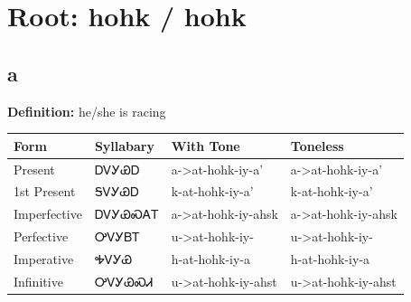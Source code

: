 \documentclass{article}%
\begin{document}
%
\normalsize%
\section*{Root: hohk / hohk}%
\subsection*{a}%
\textbf{Definition: }%
he/she is racing%
\\[0.5em]%
\begin{tabular}{|l|l|l|l|}%
\hline%
\textbf{Form}&\textbf{Syllabary}&\textbf{With Tone}&\textbf{Toneless}\\%
\hline%
Present&ᎠᏙᎩᏯᎠ&a{-}>at{-}hohk{-}iy{-}a'&a{-}>at{-}hohk{-}iy{-}a'\\%
1st Present&ᎦᏙᎩᏯᎠ&k{-}at{-}hohk{-}iy{-}a'&k{-}at{-}hohk{-}iy{-}a'\\%
Imperfective&ᎠᏙᎩᏯᏍᎪᎢ&a{-}>at{-}hohk{-}iy{-}ahsk&a{-}>at{-}hohk{-}iy{-}ahsk\\%
Perfective&ᎤᏙᎩᏴᎢ&u{-}>at{-}hohk{-}iy{-}&u{-}>at{-}hohk{-}iy{-}\\%
Imperative&ᎭᏙᎩᏯ&h{-}at{-}hohk{-}iy{-}a&h{-}at{-}hohk{-}iy{-}a\\%
Infinitive&ᎤᏙᎩᏯᏍᏗ&u{-}>at{-}hohk{-}iy{-}ahst&u{-}>at{-}hohk{-}iy{-}ahst\\%
\hline%
\end{tabular}%
\\[1em]%
\end{document}
